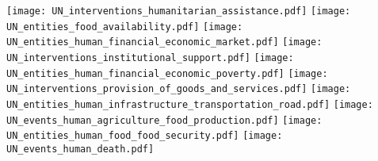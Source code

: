 \texttt{[image: UN\_interventions\_humanitarian\_assistance.pdf]}
\texttt{[image: UN\_entities\_food\_availability.pdf]}
\texttt{[image: UN\_entities\_human\_financial\_economic\_market.pdf]}
\texttt{[image: UN\_interventions\_institutional\_support.pdf]}
\texttt{[image: UN\_entities\_human\_financial\_economic\_poverty.pdf]}
\texttt{[image: UN\_interventions\_provision\_of\_goods\_and\_services.pdf]}
\texttt{[image: UN\_entities\_human\_infrastructure\_transportation\_road.pdf]}
\texttt{[image: UN\_events\_human\_agriculture\_food\_production.pdf]}
\texttt{[image: UN\_entities\_human\_food\_food\_security.pdf]}
\texttt{[image: UN\_events\_human\_death.pdf]}
